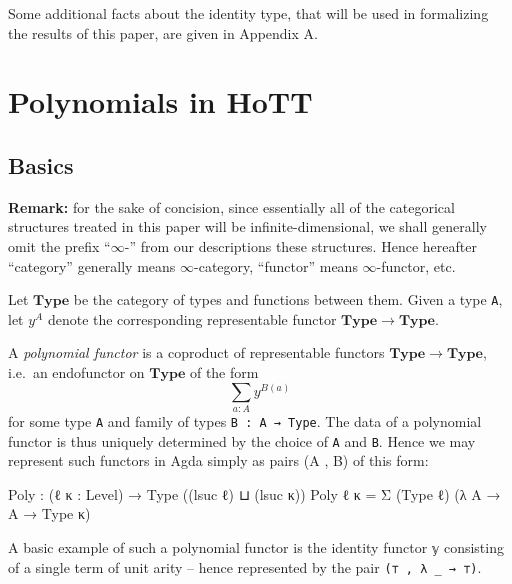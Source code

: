 \documentclass[
  11pt,
  oneside,
  article]{memoir}
\newenvironment{Shaded}{}{}
\newcommand{\NormalTok}[1]{#1}
\newcommand{\OtherTok}[1]{\textcolor[rgb]{0.00,0.44,0.13}{#1}}
\theoremstyle{definition}
\theoremstyle{plain}
\newcommand{\0}{\textsf{0}}
\newcommand{\1}{\tn{\textsf{1}}}
\begin{document}
Some additional facts about the identity type, that will be used in
formalizing the results of this paper, are given in Appendix A.

\chapter{Polynomials in HoTT}\label{polynomials-in-hott}

\section{Basics}\label{basics}

\textbf{Remark:} for the sake of concision, since essentially all of the
categorical structures treated in this paper will be
infinite-dimensional, we shall generally omit the prefix ``\(\infty\)-''
from our descriptions these structures. Hence hereafter ``category''
generally means \(\infty\)-category, ``functor'' means
\(\infty\)-functor, etc.

Let \(\mathbf{Type}\) be the category of types and functions between
them. Given a type \texttt{A}, let \(y^A\) denote the corresponding
representable functor \(\mathbf{Type} \to \mathbf{Type}\).

A \emph{polynomial functor} is a coproduct of representable functors
\(\mathbf{Type} \to \mathbf{Type}\), i.e.~an endofunctor on
\(\mathbf{Type}\) of the form \[
\sum_{a : A} y^{B(a)}
\] for some type \texttt{A} and family of types
\texttt{B\ :\ A\ →\ Type}. The data of a polynomial functor is thus
uniquely determined by the choice of \texttt{A} and \texttt{B}. Hence we
may represent such functors in Agda simply as pairs (A , B) of this
form:

\begin{Shaded}
\begin{Highlighting}[]
\NormalTok{Poly }\OtherTok{:} \OtherTok{(}\NormalTok{ℓ κ }\OtherTok{:}\NormalTok{ Level}\OtherTok{)} \OtherTok{→}\NormalTok{ Type }\OtherTok{((}\NormalTok{lsuc ℓ}\OtherTok{)}\NormalTok{ ⊔ }\OtherTok{(}\NormalTok{lsuc κ}\OtherTok{))}
\NormalTok{Poly ℓ κ }\OtherTok{=}\NormalTok{ Σ }\OtherTok{(}\NormalTok{Type ℓ}\OtherTok{)} \OtherTok{(λ}\NormalTok{ A }\OtherTok{→}\NormalTok{ A }\OtherTok{→}\NormalTok{ Type κ}\OtherTok{)}
\end{Highlighting}
\end{Shaded}

A basic example of such a polynomial functor is the identity functor
\texttt{𝕪} consisting of a single term of unit arity -- hence
represented by the pair \texttt{(⊤\ ,\ λ\ \_\ →\ ⊤)}.
\end{document}
